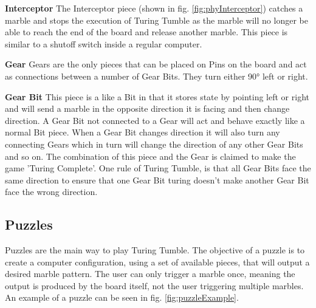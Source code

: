 \documentclass{l4proj}
\begin{document}
\textbf{Interceptor}
The Interceptor piece (shown in fig. \ref{fig:phyInterceptor}) catches a marble and stops the execution of Turing Tumble as the marble will no longer be able to reach the end of the board and release another marble. This piece is similar to a shutoff switch inside a regular computer. 

\textbf{Gear}
Gears are the only pieces that can be placed on Pins on the board and act as connections between a number of Gear Bits. They turn either 90° left or right. 

\textbf{Gear Bit}
This piece is a like a Bit in that it stores state by pointing left or right and will send a marble in the opposite direction it is facing and then change direction. A Gear Bit not connected to a Gear will act and behave exactly like a normal Bit piece. When a Gear Bit changes direction it will also turn any connecting Gears which in turn will change the direction of any other Gear Bits and so on. The combination of this piece and the Gear is claimed to make the game 'Turing Complete'. One rule of Turing Tumble, is that all Gear Bits face the same direction to ensure that one Gear Bit turing doesn't make another Gear Bit face the wrong direction.


\subsection{Puzzles}
\label{section:puzzle-background}
Puzzles are the main way to play Turing Tumble. The objective of a puzzle is to create a computer configuration, using a set of available pieces, that will output a desired marble pattern. The user can only trigger a marble once, meaning the output is produced by the board itself, not the user triggering multiple marbles. An example of a puzzle can be seen in fig. \ref{fig:puzzleExample}.  
\end{document}
